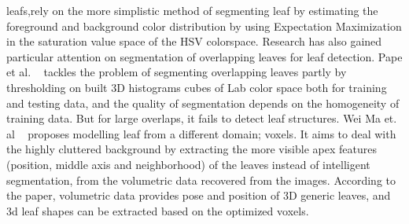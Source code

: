 leafs,rely on the more simplistic method of segmenting leaf by estimating the foreground and background color distribution by using Expectation Maximization in the saturation value space of the HSV colorspace. Research has also gained particular attention on segmentation of overlapping leaves for leaf detection. Pape et al. ~\cite{Pape2015} tackles the problem of segmenting overlapping leaves partly by thresholding on built 3D histograms cubes of Lab color space both for training and testing data, and the quality of segmentation depends on the homogeneity of training data. But for large overlaps, it fails to detect leaf structures. Wei Ma et. al ~\cite{ma2008image} proposes modelling leaf from a different domain; voxels. It aims to deal with the highly cluttered background by extracting the more visible apex features (position, middle axis and neighborhood) of the leaves instead of intelligent segmentation, from the volumetric data recovered from the images. According to the paper, volumetric data provides pose and position of 3D generic leaves, and 3d leaf shapes can be extracted based on the optimized voxels.


